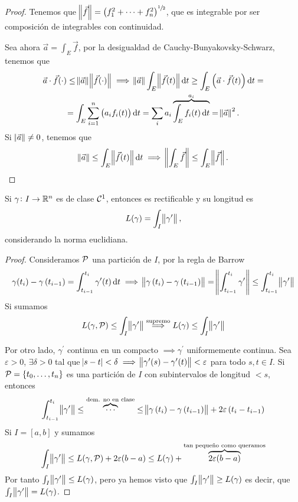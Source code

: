 \begin{proof}
    Tenemos que $\norm{\vec{f}} = \left( f^2_1 + \cdots + f^2_n \right)^{\sfrac{1}{2}}$, que es integrable por ser composición de
    integrables con continuidad.

    Sea ahora $\vec{a} = \int_E \vec{f}$, por la desigualdad de Cauchy-Bunyakovsky-Schwarz, tenemos que
    \begin{gather*}
        \vec{a} \cdot \vec{f}(\cdot) \leq \norm{\vec{a}} \norm{\vec{f}(\cdot)} \implies
        \norm{\vec{a}} \int_E \norm{\vec{f}(t)} \dif t \geq \int_E \left( \vec{a} \cdot \vec{f}(t) \right) \dif t = \\ =
        \int_E \sum^n_{i=1} \left(a_if_i(t) \right) \dif t = \sum_i a_i \overbrace{\int_E f_i(t) \dif t}^{a_i} = \norm{\vec{a}}^2.
    \end{gather*}
    Si $\norm{\vec{a}} \neq 0$, tenemos que
    \[
        \norm{\vec{a}} \leq \int_E \norm{\vec{f}(t)} \dif t \implies
        \norm{\int_E \vec{f}} \leq \int_E \norm{\vec{f}}.
    \]
\end{proof}


\begin{prop}
    Si $\gamma \colon I \to \mathbb{R}^n$ es de clase $\mathcal{C}^1$, entonces es rectificable y su longitud es
    \[
        L(\gamma) = \int_I \norm{\gamma^\prime},
    \]
	considerando la norma euclidiana.
\end{prop}

\begin{proof}
	Consideramos $\mathcal{P}$ una partición de $I$, por la regla de Barrow
	\[
        \gamma(t_i) - \gamma\left( t_{i-1} \right) = \int^{t_i}_{t_{i-1}} \gamma^\prime(t) \dif t \implies
        \norm{\gamma\left( t_i \right) - \gamma\left( t_{i-1} \right)} = \norm{\int^{t_i}_{t_{i-1}} \gamma^\prime
        } \leq \int^{t_i}_{t_{i-1}} \norm{\gamma^\prime}
	\]
    Si sumamos
    \[
        L(\gamma, \mathcal{P}) \leq \int_I \norm{\gamma^\prime} \stackrel{\text{supremo}}{\implies} L(\gamma) \leq \int_I \norm{\gamma^\prime}
    \]

    Por otro lado, $\gamma^\prime$ continua en un compacto $\implies \gamma^\prime$ uniformemente continua. Sea $\varepsilon > 0$, $\exists \delta > 0$
    tal que $\abs{s - t} < \delta \implies \norm{\gamma^\prime(s) - \gamma^\prime(t)} < \varepsilon$ para todo $s,t \in I$. Si $\mathcal{P} = \left\{t_0, \dots, t_n\right\}$
    es una partición de $I$ con subintervalos de longitud $< s$, entonces
    \[
        \int^{t_i}_{t_{i-1}} \norm{\gamma^\prime} \leq \overbrace{\cdots}^{\text{dem. no en clase}} \leq \norm{\gamma\left( t_i \right) - \gamma\left( t_{i-1} \right)}
        + 2 \varepsilon\left( t_i - t_{i-1} \right)
    \]
    Si $I = [a, b]$ y sumamos
    \[
        \int_I \norm{\gamma^\prime} \leq L(\gamma, \mathcal{P}) + 2\varepsilon(b-a) \leq L(\gamma) + \overbrace{2\varepsilon(b-a)}^{\text{tan pequeño como queramos}}
    \]
    Por tanto $\int_I \norm{\gamma^\prime} \leq L(\gamma)$, pero ya hemos visto que $\int_I \norm{\gamma^\prime} \geq L(\gamma)$ es decir, que
    $\int_I \norm{\gamma^\prime} = L(\gamma)$.
\end{proof}

